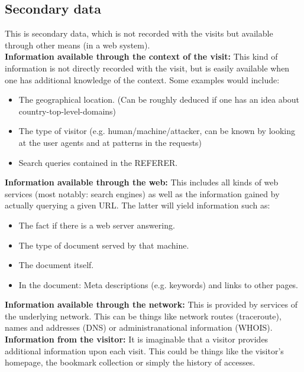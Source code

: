 \documentclass[a4paper]{danarticle}
\begin{document}
   \subsection*{Secondary data}
    This is secondary data, which is not recorded with the visits
    but available through other means (in a web system).
    \\
    \textbf{Information available through the context of the visit:}
    This kind of information is not directly recorded with the visit,
    but is easily available when one has additional knowledge of the
    context. Some examples would include:
    \begin{itemize}
    	\item{The geographical location. (Can be roughly deduced if 
    	      one has an idea about country-top-level-domains)}
    	\item{The type of visitor (e.g. human/machine/attacker,
    	      can be known by looking at the user agents and
    	      at patterns in the requests)}
    	\item{Search queries contained in the REFERER.}
    \end{itemize}
    \textbf{Information available through the web:} This includes
    all kinds of web services (most notably: search engines) as
    well as the information gained by actually querying a given
    URL. The latter will yield information such as:
    \begin{itemize}
    	\item{The fact if there is a web server answering.}
    	\item{The type of document served by that machine.}
    	\item{The document itself.}
    	\item{In the document: Meta descriptions (e.g. keywords)
    	      and links to other pages.}
    \end{itemize}
    \textbf{Information available through the network:} This is
    provided by services of the underlying network. This can
    be things like network routes (traceroute), names and addresses
    (DNS) or administranational information (WHOIS).
    \\
    \textbf{Information from the visitor:} It is imaginable that
    a visitor provides additional information upon each visit. 
    This could be things like the visitor's homepage, the 
    bookmark collection or simply the history of accesses.
\end{document}

